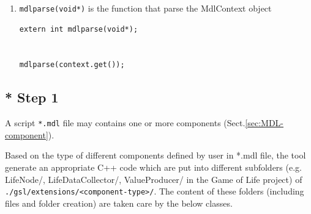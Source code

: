 \begin{enumerate}
   \item \verb!mdlparse(void*)!  is the function that parse the MdlContext object
   
   
\begin{verbatim}
extern int mdlparse(void*);


mdlparse(context.get());
\end{verbatim}
\end{enumerate}


\subsection{* Step 1}
\label{sec:MDL-how-it-works-step-1}

A script \verb!*.mdl! file may contains one or more components
(Sect.\ref{sec:MDL-component}).


Based on the type of different components defined by user in *.mdl file, the
tool generate an appropriate C++ code which are put into different subfolders (e.g.
LifeNode/, LifeDataCollector/, ValueProducer/ in the Game of Life project) of 
\verb!./gsl/extensions/<component-type>/!.
The content of these folders (including files and folder creation) are taken
care by the below classes.

